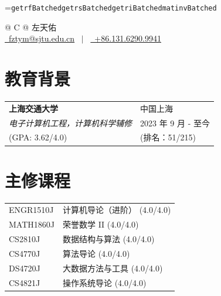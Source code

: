 \documentclass[a4paper,12pt]{article}
\begin{document}
=\hbox{\texttt{getrfBatched}\texttt{getrsBatched}\texttt{getriBatched}\texttt{matinvBatched}}

\pagestyle{empty} 


\begin{tabularx}{\linewidth}{@{} C @{}}
\Huge{左天佑} \\[7.5pt]
\href{mailto:fztym@sjtu.edu.cn}{\raisebox{-0.05\height}\faEnvelope \ fztym@sjtu.edu.cn} \ $|$ \ 
\href{tel:+8613162909941}{\raisebox{-0.05\height}\faMobile \ +86.131.6290.9941} \\
\end{tabularx}


\section{教育背景}
\begin{tabularx}{\linewidth}{@{}l X@{}}	
\textbf{上海交通大学} & 中国上海 \\
\textit{电子计算机工程，计算机科学辅修} & 2023 年 9 月 - 至今 \\  
\normalsize (GPA: 3.62/4.0) & (排名：51/215)\\
\end{tabularx}


\section{主修课程}
\begin{tabularx}{\linewidth}{@{}l X@{}}	
ENGR1510J & 计算机导论（进阶） \hfill \normalsize (4.0/4.0)\\
MATH1860J & 荣誉数学 II \hfill \normalsize (4.0/4.0)\\
CS2810J & 数据结构与算法 \hfill \normalsize (4.0/4.0)\\
CS4770J & 算法导论 \hfill \normalsize (4.0/4.0)\\
DS4720J & 大数据方法与工具 \hfill \normalsize (4.0/4.0)\\
CS4821J & 操作系统导论 \hfill \normalsize (4.0/4.0)
\end{tabularx}
\end{document}
